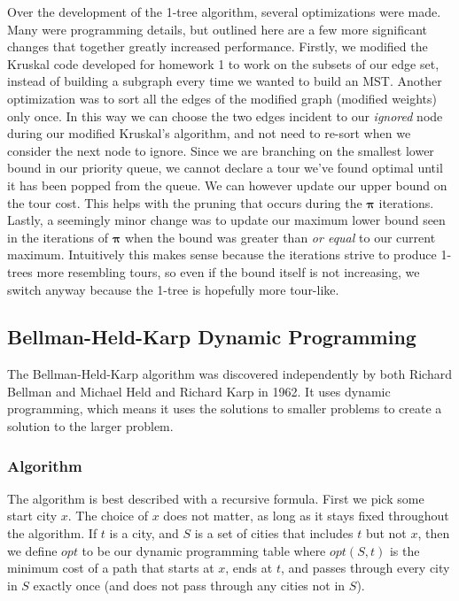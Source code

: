 \documentclass[11pt]{article}
\newcommand{\ve}[1]{\boldsymbol{#1}}
\begin{document}
	Over the development of the 1-tree algorithm, several optimizations were made. Many were programming details, but outlined here are a few more significant changes that together greatly increased performance. Firstly, we modified the Kruskal code developed for homework 1 to work on the subsets of our edge set, instead of building a subgraph every time we wanted to build an MST. Another optimization was to sort all the edges of the modified graph (modified weights) only once. In this way we can choose the two edges incident to our \emph{ignored} node during our modified Kruskal's algorithm, and not need to re-sort when we consider the next node to ignore. Since we are branching on the smallest lower bound in our priority queue, we cannot declare a tour we've found optimal until it has been popped from the queue. We can however update our upper bound on the tour cost. This helps with the pruning that occurs during the $\ve{\pi}$ iterations. Lastly, a seemingly minor change was to update our maximum lower bound seen in the iterations of $\ve{\pi}$ when the bound was greater than \emph{or equal} to our current maximum. Intuitively this makes sense because the iterations strive to produce 1-trees more resembling tours, so even if the bound itself is not increasing, we switch anyway  because the 1-tree is hopefully more tour-like.
	
	\subsection{Bellman-Held-Karp Dynamic Programming}
	
	The Bellman-Held-Karp algorithm was discovered independently by both Richard Bellman \cite{Bellman} and Michael Held and Richard Karp \cite{HeldKarp} in 1962. It uses dynamic programming, which means it uses the solutions to smaller problems to create a solution to the larger problem.
	
	\subsubsection{Algorithm}
	
	The algorithm is best described with a recursive formula. First we pick some start city $x$. The choice of $x$ does not matter, as long as it stays fixed throughout the algorithm. If $t$ is a city, and $S$ is a set of cities that includes $t$ but not $x$, then we define $opt$ to be our dynamic programming table where $opt(S,t)$ is the minimum cost of a path that starts at $x$, ends at $t$, and passes through every city in $S$ exactly once (and does not pass through any cities not in $S$).
	
\end{document}
